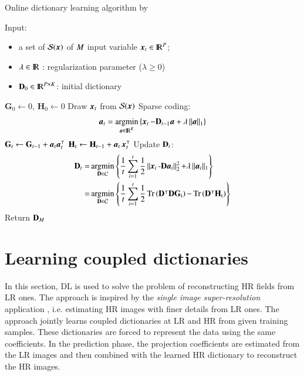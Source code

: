 \begin{algorithm}[t]
\caption{Online dictionary learning algorithm by  \citet{mairal2010online}} \label{algo_ODL}
\begin{algorithmic}[1]
	\State Input: 
	\begin{itemize}
		\item a set of $ \mathcal{S}(\operatorname{\boldsymbol{x}}) $ of $M $ input variable $ \operatorname{\boldsymbol{x}}_t \in {\rm I\!R}^P$;
		\item $\lambda \in {\rm I\!R} $ : regularization parameter ($ \lambda \geq 0 $)
		\item $ \mathbf{D}_0 \in {\rm I\!R}^{P \times K}$: initial dictionary
	\end{itemize}
	\State $ \mathbf{G}_0 \gets  0$, $ \mathbf{H}_0 \gets 0 $
		\State Draw $ \operatorname{\boldsymbol{x}}_t $ from $\mathcal{S}(\operatorname{\boldsymbol{x}})$
		\State Sparse coding:
		\begin{equation}
			\boldsymbol{a}_t = \operatorname*{\arg\!\min}_{\boldsymbol{a} \in {\rm I\!R}^K} \left\lbrace \operatorname{\boldsymbol{x}}_t - \mathbf{D}_{t-1}\boldsymbol{a} +\lambda \operatorname{\Arrowvert \mathit{\boldsymbol{a}} \Arrowvert_1 }\right\rbrace
		\end{equation}
		\State $ \mathbf{G}_t \gets \mathbf{G}_{t-1}+\boldsymbol{a}_t \boldsymbol{a}_t^\intercal$
		\State $ \mathbf{H}_t \gets \mathbf{H}_{t-1}+\boldsymbol{a}_t \operatorname{\boldsymbol{x}}_t^\intercal$
		\State Update $ \mathbf{D}_t $:
		\begin{equation}
			\begin{split}
			\mathbf{D}_t = & \operatorname*{\arg\!\min}_{\mathbf{D} \in \mathcal{C}} \left\lbrace \frac{1}{t} \sum\limits_{i=1}^{t}\frac{1}{2} \operatorname{\Arrowvert \mathit{\operatorname{\boldsymbol{x}}_i - \mathbf{D}\boldsymbol{a}_i} \Arrowvert^2_2 } + \lambda \operatorname{\Arrowvert \mathit{\boldsymbol{a}_i} \Arrowvert_1 } \right\rbrace \\
			=& \operatorname*{\arg\!\min}_{\mathbf{D} \in \mathcal{C}} \left\lbrace \frac{1}{t} \sum\limits_{i=1}^{t}\frac{1}{2} \operatorname{\text{Tr} \left( \mathbf{D}^\intercal\mathbf{D} \mathbf{G}_t \right)} - \operatorname{\text{Tr} \left( \mathbf{D}^\intercal \mathbf{H}_t \right)} \right\rbrace
			\end{split}
		\end{equation}
	\EndFor
	\State Return $ \mathbf{D}_M $
\end{algorithmic}
\end{algorithm}

\section{Learning coupled dictionaries}
\label{joint_learning}
In this section, DL is used to solve the problem of reconstructing HR fields from LR ones. The approach is inspired by the \textit{single image super-resolution} application \citep{yang2010image,yang2012coupled,zeyde2012single}, i.e. estimating HR images with finer details from LR ones. The approach jointly learns coupled dictionaries at LR and HR from given training samples. These dictionaries are forced to represent the data using the same coefficients. In the prediction phase, the projection coefficients are estimated from the LR images and then combined with the learned HR dictionary to reconstruct the HR images. 

